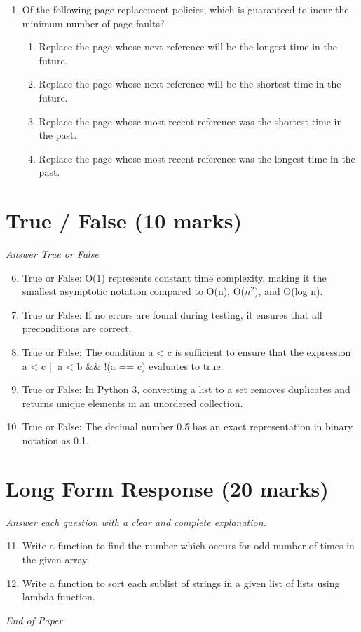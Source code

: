 \documentclass[12pt]{article}
\begin{document}
\begin{enumerate}[label=\arabic*.]
\begin{enumerate}[label=(\alph*)]
    \item To determine the hardware address of a given IP address
\end{enumerate}
\item Of the following page-replacement policies, which is guaranteed to incur the minimum number of page faults?
\begin{enumerate}[label=(\alph*)]
    \item Replace the page whose next reference will be the longest time in the future.
    \item Replace the page whose next reference will be the shortest time in the future.
    \item Replace the page whose most recent reference was the shortest time in the past.
    \item Replace the page whose most recent reference was the longest time in the past.
\end{enumerate}
\end{enumerate}

\section*{True / False (10 marks)}
\textit{Answer True or False}
\begin{enumerate}[label=\arabic*.]
\setcounter{enumi}{5}
\item True or False: O(1) represents constant time complexity, making it the smallest asymptotic notation compared to O(n), O($n^2$), and O(log n).
\item True or False: If no errors are found during testing, it ensures that all preconditions are correct.
\item True or False: The condition a \textless{} c is sufficient to ensure that the expression a \textless{} c || a \textless{} b \&\& !(a == c) evaluates to true.
\item True or False: In Python 3, converting a list to a set removes duplicates and returns unique elements in an unordered collection.
\item True or False: The decimal number 0.5 has an exact representation in binary notation as 0.1.
\end{enumerate}

\section*{Long Form Response (20 marks)}
\textit{Answer each question with a clear and complete explanation.}
\begin{enumerate}[label=\arabic*.]
\setcounter{enumi}{10}
\item Write a function to find the number which occurs for odd number of times in the given array.
\item Write a function to sort each sublist of strings in a given list of lists using lambda function.
\end{enumerate}

\vfill
\noindent\textit{End of Paper}
\end{document}
